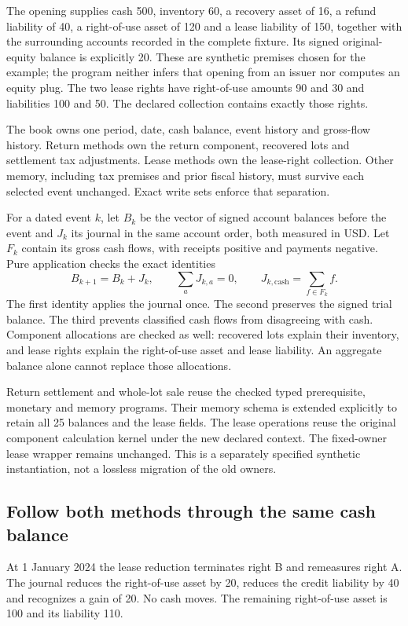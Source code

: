 The opening supplies cash 500, inventory 60, a recovery asset of 16, a refund
liability of 40, a right-of-use asset of 120 and a lease liability of 150, together
with the surrounding accounts recorded in the complete fixture. Its signed
original-equity balance is explicitly 20. These are synthetic premises chosen
for the example; the program neither infers that opening from an issuer nor
computes an equity plug. The two lease rights have right-of-use amounts 90 and
30 and liabilities 100 and 50. The declared collection contains exactly those
rights.

The book owns one period, date, cash balance, event history and gross-flow
history. Return methods own the return component, recovered lots and settlement
tax adjustments. Lease methods own the lease-right collection. Other memory,
including tax premises and prior fiscal history, must survive each selected
event unchanged. Exact write sets enforce that separation.

For a dated event $k$, let $B_k$ be the vector of signed account balances before
the event and $J_k$ its journal in the same account order, both measured in USD.
Let $F_k$ contain its gross cash flows, with receipts positive and payments
negative. Pure application checks the exact identities
\[
 B_{k+1}=B_k+J_k,\qquad
 \sum_a J_{k,a}=0,\qquad
 J_{k,\mathrm{cash}}=\sum_{f\in F_k}f.
\]
The first identity applies the journal once. The second preserves the signed
trial balance. The third prevents classified cash flows from disagreeing with
cash. Component allocations are checked as well: recovered lots explain their
inventory, and lease rights explain the right-of-use asset and lease liability.
An aggregate balance alone cannot replace those allocations.

Return settlement and whole-lot sale reuse the checked typed prerequisite,
monetary and memory programs. Their memory schema is extended explicitly to
retain all 25 balances and the lease fields. The lease operations reuse the
original component calculation kernel under the new declared context. The
fixed-owner lease wrapper remains unchanged. This is a separately specified
synthetic instantiation, not a lossless migration of the old owners.

\subsection{Follow both methods through the same cash balance}

At 1 January 2024 the lease reduction terminates right B and remeasures right A.
The journal reduces the right-of-use asset by 20, reduces the credit liability
by 40 and recognizes a gain of 20. No cash moves. The remaining right-of-use
asset is 100 and its liability 110.

